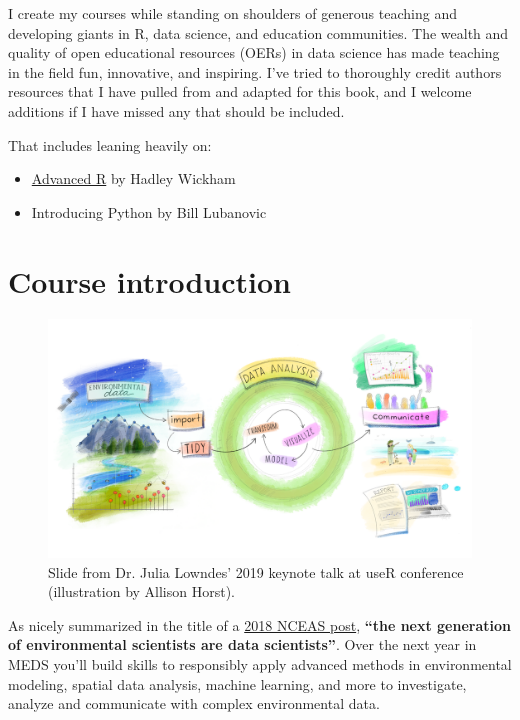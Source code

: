 \documentclass[
]{book}
\providecommand{\tightlist}{%
  \setlength{\itemsep}{0pt}\setlength{\parskip}{0pt}}
\begin{document}
I create my courses while standing on shoulders of generous teaching and developing giants in R, data science, and education communities. The wealth and quality of open educational resources (OERs) in data science has made teaching in the field fun, innovative, and inspiring. I've tried to thoroughly credit authors resources that I have pulled from and adapted for this book, and I welcome additions if I have missed any that should be included.

That includes leaning heavily on:

\begin{itemize}
\tightlist
\item
  \href{http://adv-r.had.co.nz/}{Advanced R} by Hadley Wickham \citep{wickham_advanced_2019}
\item
  Introducing Python by Bill Lubanovic \citep{lubanovic_introducing_2014}
\end{itemize}

\hypertarget{course-introduction}{%
\section{Course introduction}\label{course-introduction}}

\begin{figure}

{\centering \includegraphics[width=1\linewidth]{images/eds_r4ds} 

}

\caption{Slide from Dr. Julia Lowndes' 2019 keynote talk at useR conference (illustration by Allison Horst).}\label{fig:unnamed-chunk-1}
\end{figure}

As nicely summarized in the title of a \href{https://www.nceas.ucsb.edu/news/next-generation-environmental-scientists-are-data-scientists}{2018 NCEAS post}, \textbf{``the next generation of environmental scientists are data scientists''}. Over the next year in MEDS you'll build skills to responsibly apply advanced methods in environmental modeling, spatial data analysis, machine learning, and more to investigate, analyze and communicate with complex environmental data.
\end{document}
